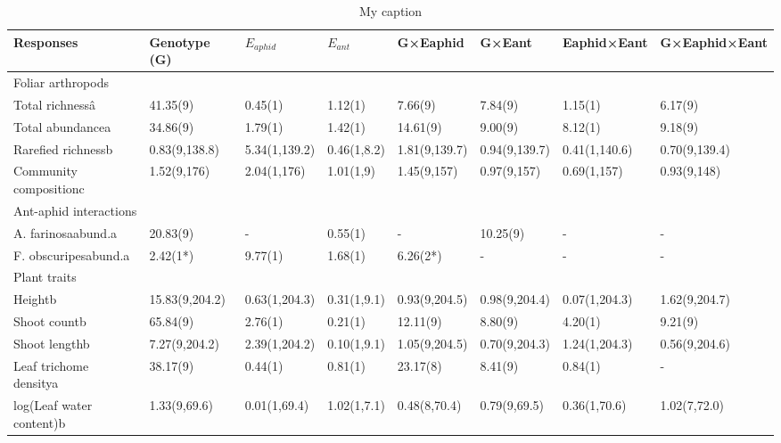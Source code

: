 \begin{table}[]
\centering
\caption{My caption}
\label{my-label}
\begin{tabular}{@{}llllllll@{}}
\toprule
Responses                & Genotype (G)   & \(E_{aphid}\)        &  \(E_{ant}\)        & G×Eaphid      & G×Eant        & Eaphid×Eant   & G×Eaphid×Eant \\ \midrule
Foliar arthropods        &                &               &             &               &               &               &               \\
Total richness\^a         & 41.35(9)       & 0.45(1)       & 1.12(1)     & 7.66(9)       & 7.84(9)       & 1.15(1)       & 6.17(9)       \\
Total abundancea         & 34.86(9)       & 1.79(1)       & 1.42(1)     & 14.61(9)      & 9.00(9)       & 8.12(1)       & 9.18(9)       \\
Rarefied richnessb       & 0.83(9,138.8)  & 5.34(1,139.2) & 0.46(1,8.2) & 1.81(9,139.7) & 0.94(9,139.7) & 0.41(1,140.6) & 0.70(9,139.4) \\
Community compositionc   & 1.52(9,176)    & 2.04(1,176)   & 1.01(1,9)   & 1.45(9,157)   & 0.97(9,157)   & 0.69(1,157)   & 0.93(9,148)   \\
Ant-aphid interactions   &                &               &             &               &               &               &               \\
A. farinosaabund.a       & 20.83(9)       & -             & 0.55(1)     & -             & 10.25(9)      & -             & -             \\
F. obscuripesabund.a     & 2.42(1*)       & 9.77(1)       & 1.68(1)     & 6.26(2*)      & -             & -             & -             \\
Plant traits             &                &               &             &               &               &               &               \\
Heightb                  & 15.83(9,204.2) & 0.63(1,204.3) & 0.31(1,9.1) & 0.93(9,204.5) & 0.98(9,204.4) & 0.07(1,204.3) & 1.62(9,204.7) \\
Shoot countb             & 65.84(9)       & 2.76(1)       & 0.21(1)     & 12.11(9)      & 8.80(9)       & 4.20(1)       & 9.21(9)       \\
Shoot lengthb            & 7.27(9,204.2)  & 2.39(1,204.2) & 0.10(1,9.1) & 1.05(9,204.5) & 0.70(9,204.3) & 1.24(1,204.3) & 0.56(9,204.6) \\
Leaf trichome densitya   & 38.17(9)       & 0.44(1)       & 0.81(1)     & 23.17(8)      & 8.41(9)       & 0.84(1)       & -             \\
log(Leaf water content)b & 1.33(9,69.6)   & 0.01(1,69.4)  & 1.02(1,7.1) & 0.48(8,70.4)  & 0.79(9,69.5)  & 0.36(1,70.6)  & 1.02(7,72.0)  \\ \bottomrule
\end{tabular}
\end{table}